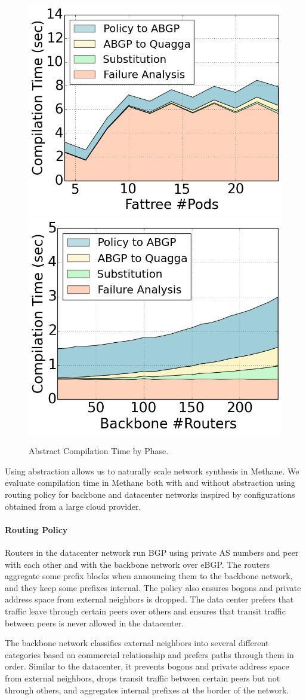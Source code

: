 \documentclass{sig-alternate-10pt}
\newcommand{\sysname}{{\small \sf Methane}\xspace}
\newcommand{\para}[1]{\paragraph*{\textbf{#1}}}
\begin{document}
\begin{figure}[t!]
    {\includegraphics[width=.49\columnwidth]{figures/Fattree-analysis-time.png}}
    {\includegraphics[width=.49\columnwidth]{figures/backbone-analysis-time.png}} \\
  \caption{Abstract Compilation Time by Phase. \label{fig:abstract-breakdown}}
  \vspace{-1em}
\end{figure}

Using abstraction allows us to naturally scale network synthesis in \sysname. We evaluate compilation time in \sysname both with and without abstraction using routing policy for backbone and datacenter networks inspired by configurations obtained from a large cloud provider.

\para{Routing Policy}

Routers in the datacenter network run BGP using private AS numbers and peer with each other and with the backbone network over eBGP. The routers aggregate some prefix blocks when announcing them to the backbone network, and they keep some prefixes internal. The policy also ensures bogons and private address space from external neighbors is dropped. The data center prefers that traffic leave through certain peers over others and ensures that transit traffic between peers is never allowed in the datacenter.

The backbone network classifies external neighbors into several different categories based on commercial relationship and prefers paths through them in order. Similar to the datacenter, it prevents bogons and private address space from external neighbors, drops transit traffic between certain peers but not through others, and aggregates internal prefixes at the border of the network.
\end{document}
